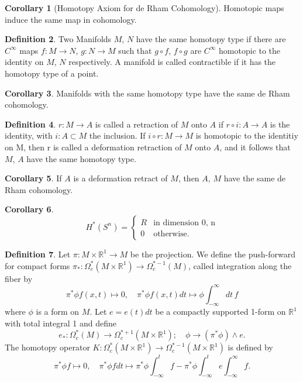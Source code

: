 \documentclass[twocolumn]{article}
\theoremstyle{definition}
\newtheorem{definition}{Definition}[section]
\newtheorem{corollary}[definition]{Corollary}
\theoremstyle{remark}
\begin{document}
\begin{corollary}[Homotopy Axiom for de Rham Cohomology]
    Homotopic maps induce the same map in cohomology.
\end{corollary}
\begin{definition}
    Two Manifolds $M$, $N$ have the same homotopy type if there are $C^\infty$ maps
    $f: M \rightarrow N$, $g: N \rightarrow M$ such that $g \circ f$, $f \circ g$ are $C^\infty$
    homotopic to the identity on $M$, $N$ respectively. A manifold is called contractible if it has the homotopy type of a point.
\end{definition}
\begin{corollary}
    Manifolds with the same homotopy type have the same de Rham cohomology.
\end{corollary}
\begin{definition}
    $r: M \rightarrow A$ is called a retraction of $M$ onto $A$ if $r \circ i: A \rightarrow A$ is the identity,
    with $i: A \subset M$ the inclusion. If $i \circ r: M \rightarrow M$ is homotopic to the identitiy on M,
    then r is called a deformation retraction of $M$ onto $A$, and it follows that $M$, $A$ have the same homotopy type.
\end{definition}
\begin{corollary}
    If $A$ is a deformation retract of $M$, then $A$, $M$ have the same de Rham cohomology.
\end{corollary}
\begin{corollary}
    \begin{equation}
        H^*(S^n) =
        \begin{cases}
            R & \textrm{in dimension 0, n}\\
            0 & \textrm{otherwise.}
        \end{cases}
    \end{equation}
\end{corollary}
\begin{definition}
    Let $\pi: M \times \mathbb{R}^1 \rightarrow M$ be the projection.
    We define the push-forward for compact forms $\pi_*: \Omega_c^*(M \times \mathbb{R}^1) \rightarrow \Omega^{*-1}_c(M)$, called integration along the fiber by
    \begin{equation}
        \pi^*\phi f(x, t) \mapsto 0, \quad \pi^*\phi f(x, t) dt \mapsto \phi \int^\infty_{-\infty} dt\,f
    \end{equation}
    where $\phi$ is a form on $M$. Let $e = e(t) dt$ be a compactly supported 1-form on $\mathbb{R}^1$ with total integral 1 and define
    \begin{equation}
        e_*: \Omega^*_c(M) \rightarrow \Omega^{*+1}_c(M\times \mathbb{R}^1); \quad \phi \rightarrow (\pi^*\phi) \wedge e.
    \end{equation}
    The homotopy operator $K: \Omega_c^*(M \times \mathbb{R}^1) \rightarrow\Omega_c^{*-1}(M \times \mathbb{R}^1)$ is defined by
    \begin{equation}
        \pi^*\phi f \mapsto 0, \quad \pi^*\phi f dt \mapsto \pi^*\phi \int^t_{-\infty} f - \pi^*\phi \int^t_{-\infty} e \int^\infty_{-\infty}f.
    \end{equation}
\end{definition}
\end{document}
